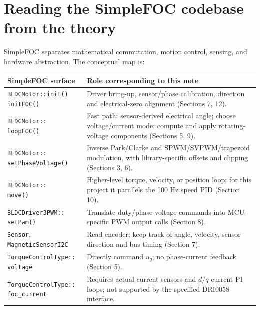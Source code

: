 \documentclass[10pt,letterpaper]{article}
\begin{document}
\section{Reading the SimpleFOC codebase from the theory}
SimpleFOC separates mathematical commutation, motion control, sensing, and hardware abstraction. The conceptual map is:
\begin{center}
\begin{tabularx}{\linewidth}{@{}p{48mm}X@{}}\toprule
SimpleFOC surface & Role corresponding to this note\\\midrule
\shortstack[l]{\texttt{BLDCMotor::init()}\\\texttt{initFOC()}} & Driver bring-up, sensor/phase calibration, direction and electrical-zero alignment (Sections 7, 12).\\
\shortstack[l]{\texttt{BLDCMotor::}\\\texttt{loopFOC()}} & Fast path: sensor-derived electrical angle; choose voltage/current mode; compute and apply rotating-voltage components (Sections 5, 9).\\
\shortstack[l]{\texttt{BLDCMotor::}\\\texttt{setPhaseVoltage()}} & Inverse Park/Clarke and SPWM/SVPWM/trapezoid modulation, with library-specific offsets and clipping (Sections 3, 6).\\
\shortstack[l]{\texttt{BLDCMotor::}\\\texttt{move()}} & Higher-level torque, velocity, or position loop; for this project it parallels the 100 Hz speed PID (Section 10).\\
\shortstack[l]{\texttt{BLDCDriver3PWM::}\\\texttt{setPwm()}} & Translate duty/phase-voltage commands into MCU-specific PWM output calls (Section 8).\\
\texttt{Sensor}, \texttt{MagneticSensorI2C} & Read encoder; keep track of angle, velocity, sensor direction and bus timing (Section 7).\\
\shortstack[l]{\texttt{TorqueControlType::}\\\texttt{voltage}} & Directly command $u_q$; no phase-current feedback (Section 5).\\
\shortstack[l]{\texttt{TorqueControlType::}\\\texttt{foc\_current}} & Requires actual current sensors and $d/q$ current PI loops; not supported by the specified DRI0058 interface.\\\bottomrule
\end{tabularx}
\end{center}
\end{document}

